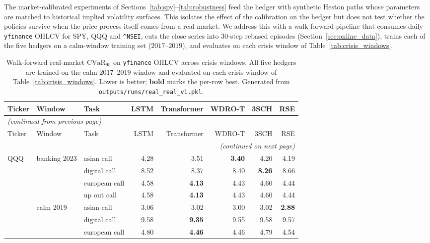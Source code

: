 \documentclass[11pt,oneside]{report}
\newcommand{\cvar}{\mathrm{CVaR}}
\begin{document}
The market-calibrated experiments of Sections~\ref{tab:spy}--\ref{tab:robustness} feed the hedger with synthetic Heston paths whose parameters are matched to historical implied volatility surfaces.  This isolates the effect of the calibration on the hedger but does not test whether the policies survive when the price process itself comes from a real market.  We address this with a walk-forward pipeline that consumes daily \texttt{yfinance} OHLCV for SPY, QQQ and \texttt{\^{}NSEI}, cuts the close series into 30-step rebased episodes (Section~\ref{sec:online_data}), trains each of the five hedgers on a calm-window training set ($2017$--$2019$), and evaluates on each crisis window of Table~\ref{tab:crisis_windows}.


{\scriptsize
\begin{longtable}{@{}p{1.3cm}p{1.7cm}p{1.6cm}rrrrr@{}}
\caption{Walk-forward real-market $\cvar_{95}$ on \texttt{yfinance} OHLCV across crisis windows.  All five hedgers are trained on the calm 2017--2019 window and evaluated on each crisis window of Table~\ref{tab:crisis_windows}.  Lower is better; \textbf{bold} marks the per-row best.  Generated from \texttt{outputs/runs/real\_real\_v1.pkl}.\label{tab:real_results}}\\
\toprule
Ticker & Window & Task & LSTM & Transformer & WDRO-T & 3SCH & RSE \\
\midrule
\endfirsthead
\multicolumn{8}{l}{\emph{(continued from previous page)}}\\
\toprule
Ticker & Window & Task & LSTM & Transformer & WDRO-T & 3SCH & RSE \\
\midrule
\endhead
\midrule
\multicolumn{8}{r}{\emph{(continued on next page)}}\\
\endfoot
\bottomrule
\endlastfoot
QQQ & banking 2023 & asian call & 4.28 & 3.51 & \textbf{3.40} & 4.20 & 4.19 \\
 &  & digital call & 8.52 & 8.37 & 8.40 & \textbf{8.26} & 8.66 \\
 &  & european call & 4.58 & \textbf{4.13} & 4.43 & 4.60 & 4.44 \\
 &  & up out call & 4.58 & \textbf{4.13} & 4.43 & 4.60 & 4.44 \\
 & calm 2019 & asian call & 3.06 & 3.02 & 3.00 & 3.02 & \textbf{2.88} \\
 &  & digital call & 9.58 & \textbf{9.35} & 9.55 & 9.58 & 9.57 \\
 &  & european call & 4.80 & \textbf{4.46} & 4.46 & 4.79 & 4.54 \\

\end{longtable}}
\end{document}

